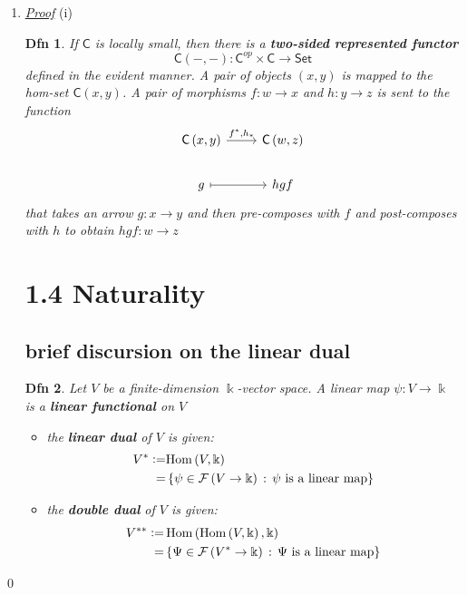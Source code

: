\documentclass{article}
\theoremstyle{spacious}
\newtheorem*{dfn}{Dfn}
\newenvironment{pf}{\begin{enumerate} \item[] \textit{\underline{Proof}} }{\end{enumerate}\qed}
\renewcommand{\:}{\vcentcolon=} %
\renewcommand{\k}{\Bbbk}
\DeclareMathOperator{\Hom}{Hom}
\begin{document}
\begin{pf}{(i)}
\begin{dfn} If \(\mathsf{C}\) is locally small, then there is a \textbf{two-sided represented functor}
    \[
        \mathsf{C} \left(-,-\right): \mathsf{C}^{op}\times \mathsf{C} \to \mathsf{Set}
    \]
    defined in the evident manner.  A pair of objects \(\left(x,y\right)\) is mapped to the hom-set \(\mathsf{C} \left(x,y\right)\).  A pair of morphisms \(f:w\to x\) and \(h:y\to z\) is sent to the function
    \[\begin{tikzcd}
        \mathsf{C}\left(x,y\right) \arrow[r,"{f^*,h_*}"] & \mathsf{C}\left(w,z\right) \\
        g \ar[r,mapsto] & hgf
    \end{tikzcd}\]
that takes an arrow \(g:x\to y\) and then pre-composes with \(f\) and post-composes with \(h\) to obtain \(hgf:w\to z\)
\end{dfn}

\section*{1.4 Naturality}

\subsection*{brief discursion on the linear dual}

\begin{dfn} Let \(V\) be a finite-dimension \(\k\)-vector space.  A linear map \(\psi:V\to \k\) is a \textbf{linear functional} on \(V\)
    \begin{itemize}
        \item the \textbf{linear dual} of \(V\) is given:
        \[\begin{aligned}
            V^*\:&\mathrm{Hom}\left(V,\k\right)\\
            =&\left\{\psi \in \mathcal{F} \left(V\to \k\right)\, : \,\psi \text{ is a linear map}\right\}
        \end{aligned}\]
        \item the \textbf{double dual} of \(V\) is given:
        \[\begin{aligned}
            V^{**} \:& \Hom\left(\Hom\left(V,\k\right),\k\right)\\
            =&\left\{\Psi \in \mathcal{F} \left(V^*\to \k\right)\, : \,\Psi \text{ is a linear map}\right\}
        \end{aligned}\]
    \end{itemize}
\end{dfn}


\end{pf}
\end{document}
